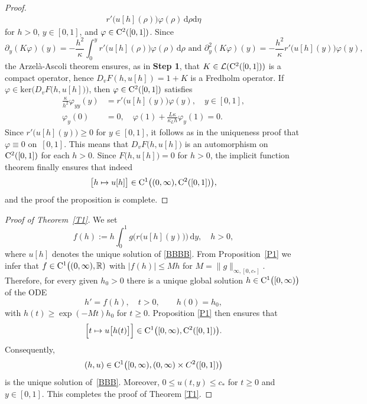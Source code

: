 \documentclass[reqno,11pt]{amsart}
\numberwithin{equation}{section}
\newcommand{\R}{\mathbb{R}}
\newcommand{\rd}{\mathrm{d}}
\begin{document}
\begin{proof}
\begin{align*}
r'\bigl( u[h](\rho)\bigr)\varphi(\rho)\,\rd \rho \rd \eta
\end{align*}
for $h>0$, $y\in [0,1]$, and $\varphi\in
{\rm C}^2([0,1])$. Since
$$
\partial_y (K\varphi) (y)=-\frac{h^2}{\kappa} \int_0^y  r'\bigl(
u[h](\rho)\bigr)\varphi(\rho)\,\rd \rho\text{ and } 
\partial_y^2 (K\varphi) (y)=-\frac{h^2}{\kappa}  r'\bigl(
u[h](y)\bigr)\varphi(y),
$$
the Arzel\`a-Ascoli theorem ensures, as in {\bf Step 1}, that $K\in
\mathcal{L}({\rm C}^2([0,1]))$ is a compact operator, hence
$D_v F(h,u[h]) =1+ K$ is a Fredholm operator. If $\varphi\in \mathrm{ker}
\bigl(D_v F\bigl(h,u[h]\bigr)\bigr)$, then $\varphi\in
{\rm C}^2([0,1])$ satisfies
\begin{align*}
\frac{\kappa}{h^2}\varphi_{yy}(y)&= r'\bigl(u[h](y)\bigr)\varphi(y), \quad y\in [0,1],\\
\varphi_y(0)&=0,\quad \varphi(1)+\frac{L\kappa}{\kappa_L h}\varphi_y(1)=0.
\end{align*}
Since $r'\bigl( u[h](y)\bigr )\ge 0$ for $y\in [0,1]$, it follows as
in the uniqueness proof that $\varphi\equiv 0$ on~$[0,1]$. This means
that $D_v F\bigl( h,u[h]\bigr)$ is an automorphism on
${\rm C}^2([0,1])$ for each $h>0$. Since $F\bigl(
h,u[h]\bigr)=0$ for $h>0$, the implicit function theorem finally
ensures that indeed 
$$
\big[ h\mapsto u[h] \big]\in {\rm C}^1\bigl((0,\infty),
{\rm C}^2([0,1])\big),
$$
and the proof the proposition is complete.
\end{proof}

\begin{proof}[Proof of Theorem~\ref{T1}]
We set
\begin{equation}
\label{f}
f(h):=h\int_0^1 g\bigl(r\bigl(u[h](y)\bigr)\bigr)\,\rd y,\quad h>0,
\end{equation}
where $u[h]$ denotes the unique solution  of \eqref{BBBB}. From
Proposition~\ref{P1} we infer that \mbox{$f\in {\rm
    C}^1\big((0,\infty),\R)$} with $\vert f(h)\vert\le Mh$ for
$M=\|g\|_{\infty,[0,c_*]}$. Therefore, for every given $h_0>0$ there
is a unique global solution $h\in {\rm C}^1\bigl([0,\infty)\bigr)$
of the ODE
$$ 
h'=f(h),\quad  t>0,\qquad h(0)=h_0,
$$
with $h(t)\ge \exp(-M t)h_0$ for $t\ge 0$. Proposition \ref{P1} then
ensures that
$$
\Bigl[ t\mapsto u\bigl[h(t)\bigr]\Bigr]\in
{\rm C}^1\big([0,\infty), {\rm C}^2([0,1])\big).
$$
Consequently,
$$
(h,u)\in {\rm C}^1\big([0,\infty),(0,\infty)\times
C^2([0,1])\big)
$$
is the unique solution of~\eqref{BBB}. Moreover, $0\le u(t,y)\le c_*$
for $t\ge 0$ and $y\in [0,1]$. This completes the proof of Theorem
\ref{T1}.
\end{proof}
\end{document}
